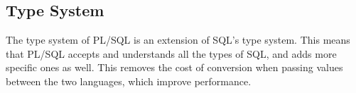 \documentclass[twoside,11pt,a4paper]{article}
\newcommand{\todo}[1]{\textit{TODO: #1}}
\begin{document}



%

\subsection{Type System}

The type system of PL/SQL is an extension of SQL's type system. This means that PL/SQL accepts and understands all the types of SQL, and adds more specific ones as well. This removes the cost of conversion when passing values between the two languages, which improve performance.
\end{document}
